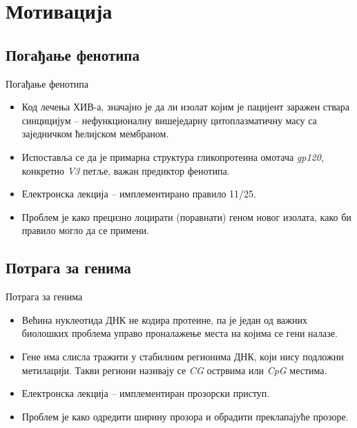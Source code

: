 \documentclass[hyperref={bookmarks=false}]{beamer}
\begin{document}
\section{Мотивација}
\subsection{Погађање фенотипа}
\begin{frame}{Погађање фенотипа}
\begin{itemize}
\item Код лечења ХИВ-а, значајно је да ли изолат којим је пацијент заражен ствара синцицијум -- нефункционалну вишеједарну цитоплазматичну масу са заједничком ћелијском мембраном.
\item Испоставља се да је примарна структура гликопротеина омотача \textit{gp120}, конкретно \textit{V3} петље, важан предиктор фенотипа.
\item Електронска лекција -- имплементирано правило 11/25.
\item Проблем је како прецизно лоцирати (поравнати) геном новог изолата, како би правило могло да се примени.
\end{itemize}
\end{frame}

\subsection{Потрага за генима}
\begin{frame}{Потрага за генима}
\begin{itemize}
\item Већина нуклеотида ДНК не кодира протеине, па је један од важних биолошких проблема управо проналажење места на којима се гени налазе.
\item Гене има слисла тражити у стабилним регионима ДНК, који нису подложни метилацији. Такви региони називају се \textit{CG} острвима или \textit{CpG} местима.
\item Електронска лекција -- имплементиран прозорски приступ.
\item Проблем је како одредити ширину прозора и обрадити преклапајуће прозоре.
\end{itemize}
\end{frame}
\end{document}
